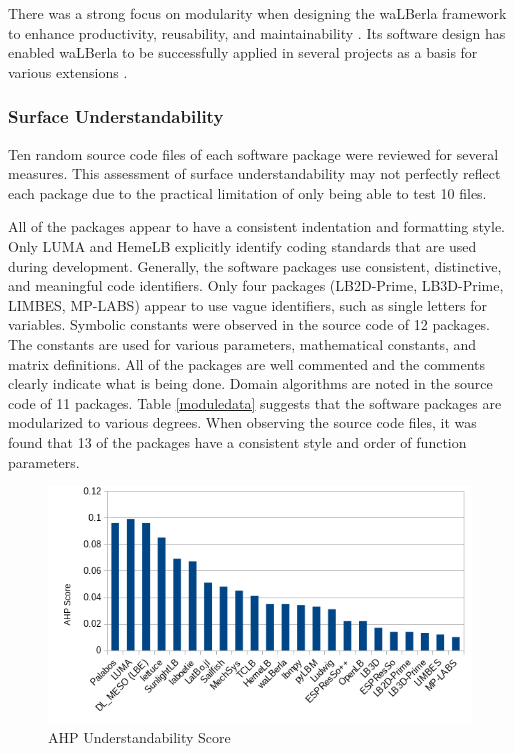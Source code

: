 \documentclass[12pt, notitlepage]{article}
\begin{document}
There was a strong focus on modularity when designing the waLBerla framework to enhance productivity, reusability, and maintainability \citep{bauer2021walberla}. Its software design has enabled waLBerla to be successfully applied in several projects as a basis for various extensions \citep{bauer2021walberla}.

\subsubsection{Surface Understandability}

Ten random source code files of each software package were reviewed for several measures. This assessment of surface understandability may not perfectly reflect each package due to the practical limitation of only being able to test 10 files. 

All of the packages appear to have a consistent indentation and formatting style. Only LUMA and HemeLB explicitly identify coding standards that are used during development. Generally, the software packages use consistent, distinctive, and meaningful code identifiers. Only four packages (LB2D-Prime, LB3D-Prime, LIMBES, MP-LABS) appear to use vague identifiers, such as single letters for variables. Symbolic constants were observed in the source code of 12 packages. The constants are used for various parameters, mathematical constants, and matrix definitions. All of the packages are well commented and the comments clearly indicate what is being done. Domain algorithms are noted in the source code of 11 packages. Table \ref{moduledata} suggests that the software packages are modularized to various degrees. When observing the source code files, it was found that 13 of the packages have a consistent style and order of function parameters.

\begin{figure}[h!]
	\begin{center}
		\includegraphics[width=1.0\textwidth]{understandability_chart}
		\caption{AHP Understandability Score}
		\label{Fig_Understandability}
	\end{center}
\end{figure}
\end{document}
